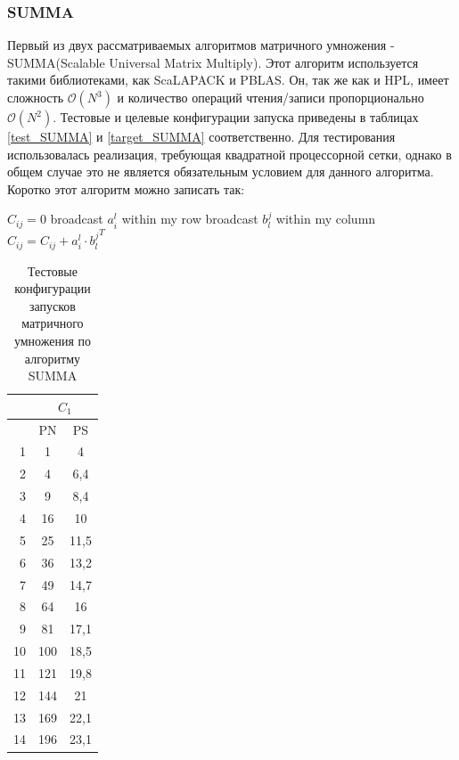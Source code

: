 		\subsubsection{SUMMA}
			Первый из двух рассматриваемых алгоритмов матричного умножения - SUMMA(Scalable Universal Matrix Multiply)\cite{SUMMA}. Этот алгоритм используется такими библиотеками, как ScaLAPACK и PBLAS. Он, так же как и HPL, имеет сложность \(\mathcal{O}(N^3)\) и количество операций чтения/записи пропорционально \(\mathcal{O}(N^2)\). Тестовые и целевые конфигурации запуска приведены в таблицах \eqref{test_SUMMA} и \eqref{target_SUMMA} соответственно. Для тестирования использовалась реализация, требующая квадратной процессорной сетки, однако в общем случае это не является обязательным условием для данного алгоритма. Коротко этот алгоритм можно записать так:
			\begin{algorithm}
				\begin{algorithmic}
					\State $C_{ij} = 0$
					\State broadcast $a_i^l$ within my row
					\State broadcast $b_l^j$ within my column
					\State $C_{ij} = C_{ij} + a_i^l \cdot {b_l^j}^T$
					\EndFor
				\label{SUMMA_algo}
				\end{algorithmic}
			\end{algorithm}

			\begin{table}
				\centering
				\begin{tabular}{|r|c|c|}
					\hline
					            & \multicolumn{2}{c|}{\(C_1\)} \\ \hline
					\textnumero & PN  & PS                     \\ \hline
					1           & 1   & 4                      \\ \hline
					2           & 4   & 6,4                    \\ \hline
					3           & 9   & 8,4                    \\ \hline
					4           & 16  & 10                     \\ \hline
					5           & 25  & 11,5                   \\ \hline
					6           & 36  & 13,2                   \\ \hline
					7           & 49  & 14,7                   \\ \hline
					8           & 64  & 16                     \\ \hline
					9           & 81  & 17,1                   \\ \hline
					10          & 100 & 18,5                   \\ \hline
					11          & 121 & 19,8                   \\ \hline
					12          & 144 & 21                     \\ \hline
					13          & 169 & 22,1                   \\ \hline
					14          & 196 & 23,1                   \\ \hline
				\end{tabular}
				\caption{Тестовые конфигурации запусков матричного умножения по алгоритму SUMMA}
				\label{test_SUMMA}
			\end{table}

